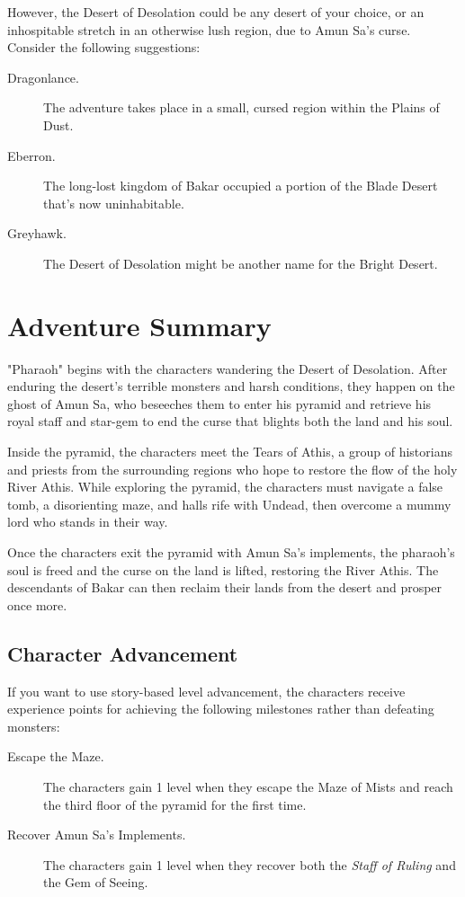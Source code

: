 \documentclass[10pt,a4paper,twoside,bg=print,twocolumn,openany,nodeprecatedcode]{dndbook}
\begin{document}
However, the Desert of Desolation could be any desert of your choice, or an inhospitable stretch in an otherwise lush region, due to Amun Sa's curse. Consider the following suggestions:


\begin{description}
\item[Dragonlance.]
The adventure takes place in a small, cursed region within the Plains of Dust.
\item[Eberron.]
The long-lost kingdom of Bakar occupied a portion of the Blade Desert that's now uninhabitable.
\item[Greyhawk.]
The Desert of Desolation might be another name for the Bright Desert.
\end{description}

\section{Adventure Summary}
"Pharaoh" begins with the characters wandering the Desert of Desolation. After enduring the desert's terrible monsters and harsh conditions, they happen on the ghost of Amun Sa, who beseeches them to enter his pyramid and retrieve his royal staff and star-gem to end the curse that blights both the land and his soul.

Inside the pyramid, the characters meet the Tears of Athis, a group of historians and priests from the surrounding regions who hope to restore the flow of the holy River Athis. While exploring the pyramid, the characters must navigate a false tomb, a disorienting maze, and halls rife with Undead, then overcome a mummy lord who stands in their way.

Once the characters exit the pyramid with Amun Sa's implements, the pharaoh's soul is freed and the curse on the land is lifted, restoring the River Athis. The descendants of Bakar can then reclaim their lands from the desert and prosper once more.

\subsection{Character Advancement}
If you want to use story-based level advancement, the characters receive experience points for achieving the following milestones rather than defeating monsters:


\begin{description}
\item[Escape the Maze.]
The characters gain 1 level when they escape the Maze of Mists and reach the third floor of the pyramid for the first time.
\item[Recover Amun Sa's Implements.]
The characters gain 1 level when they recover both the \textit{Staff of Ruling} and the Gem of Seeing.
\end{description}
\end{document}
